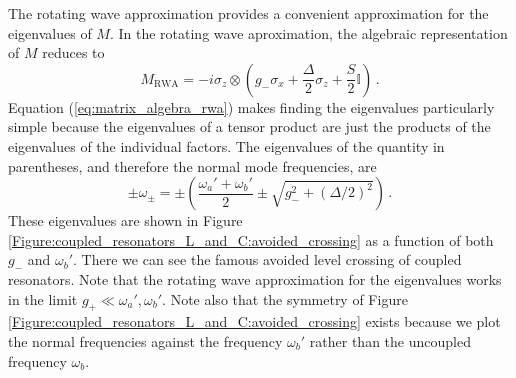 The rotating wave approximation provides a convenient approximation for the eigenvalues of $M$.
In the rotating wave aproximation, the algebraic representation of $M$ reduces to
\begin{equation}
  M_\text{RWA} = -i \sigma_z \otimes \left(
    g_- \sigma_x + \frac{\Delta}{2} \sigma_z + \frac{S}{2} \mathbb{I}
  \right)
  \, .
  \label{eq:matrix_algebra_rwa}
\end{equation}
Equation (\ref{eq:matrix_algebra_rwa}) makes finding the eigenvalues particularly simple because the eigenvalues of a tensor product are just the products of the eigenvalues of the individual factors.
The eigenvalues of the quantity in parentheses, and therefore the normal mode frequencies, are
\begin{equation}
  \pm \omega_\pm
  = \pm \left(
    \frac{\omega_a' + \omega_b'}{2} \pm \sqrt{g_-^2 + (\Delta / 2)^2 }
  \right)
  \, .
\end{equation}
These eigenvalues are shown in Figure \ref{Figure:coupled_resonators_L_and_C:avoided_crossing} as a function of both $g_-$ and $\omega_b'$.
There we can see the famous avoided level crossing of coupled resonators.
Note that the rotating wave approximation for the eigenvalues works in the limit $g_+ \ll \omega_a', \omega_b'$.
Note also that the symmetry of Figure \ref{Figure:coupled_resonators_L_and_C:avoided_crossing} exists because we plot the normal frequencies against the frequency $\omega_b'$ rather than the uncoupled frequency $\omega_b$.
